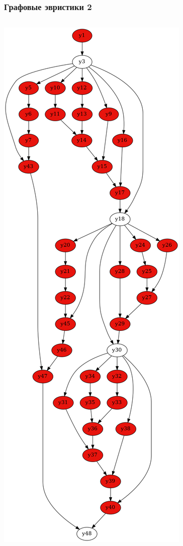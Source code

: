 \documentclass{beamer}
\begin{document}
\begin{frame}\frametitle{Графовые эвристики 2}
  \begin{columns}
  \includegraphics[width=\textwidth]{hash2if2.png}

\end{columns}
\end{frame}
\end{document}
